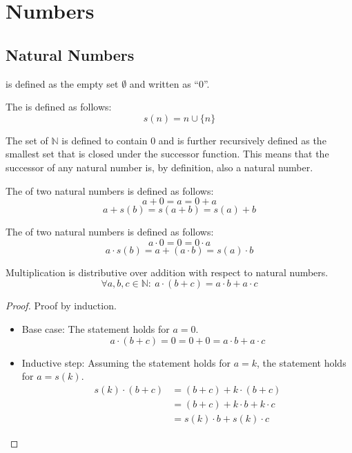\documentclass[main.tex]{subfiles}
\begin{document}
\chapter{Numbers}

\section{Natural Numbers}

\begin{de}
   is defined as the empty set $\emptyset$ and written as ``$0$''.
\end{de}

\begin{de}
  The  is defined as follows:
  \[ s(n) = n \cup \{n\} \]
\end{de}

\begin{de}
  The set of  $\mathbb{N}$ is defined to contain $0$ and is further recursively defined as the smallest set that is closed under the successor function.
  This means that the successor of any natural number is, by definition, also a natural number.
\end{de}

\begin{de}
  The  of two natural numbers is defined as follows:
  \[ a + 0 = a = 0 + a\]
  \[ a + s(b) = s(a+b) = s(a) + b \]
\end{de}

\begin{de}
  The  of two natural numbers is defined as follows:
  \[ a \cdot 0 = 0 = 0 \cdot a \]
  \[ a \cdot s(b) = a + (a\cdot b) = s(a) \cdot b\]
\end{de}

\begin{pr}
  Multiplication is distributive over addition with respect to natural numbers.
  \[ \forall a, b, c \in \mathbb{N}:\ a \cdot (b + c) = a \cdot b + a \cdot c \]

  \begin{proof}
    Proof by induction.
    \noindent
    \begin{itemize}
        \item Base case: The statement holds for $a = 0$.
          \[ a \cdot (b + c) = 0 = 0 + 0 = a \cdot b + a \cdot c \]
        \item Inductive step: Assuming the statement holds for $a = k$, the statement holds for $a = s(k)$.
          \begin{align*}
            s(k) \cdot (b + c)
            &= (b + c) + k \cdot (b + c)\\
            &= (b + c) + k \cdot b + k \cdot c\\
            &= s(k) \cdot b + s(k) \cdot c
          \end{align*}
    \end{itemize}
  \end{proof}
\end{pr}
\end{document}
